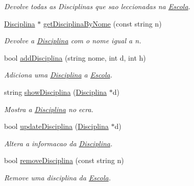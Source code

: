 \begin{DoxyCompactItemize}
\begin{DoxyCompactList}\small\item\em Devolve todas as Disciplinas que sao leccionadas na \hyperlink{class_escola}{Escola}. \end{DoxyCompactList}\item 
\hypertarget{class_escola_a75b1f1a614ca1163cf2c53f25331b939}{\hyperlink{class_disciplina}{Disciplina} $\ast$ \hyperlink{class_escola_a75b1f1a614ca1163cf2c53f25331b939}{get\-Disciplina\-By\-Nome} (const string n)}\label{class_escola_a75b1f1a614ca1163cf2c53f25331b939}

\begin{DoxyCompactList}\small\item\em Devolve a \hyperlink{class_disciplina}{Disciplina} com o nome igual a n. \end{DoxyCompactList}\item 
\hypertarget{class_escola_ad60836279a3f0a7d974a49b950aabda0}{bool \hyperlink{class_escola_ad60836279a3f0a7d974a49b950aabda0}{add\-Disciplina} (string nome, int d, int h)}\label{class_escola_ad60836279a3f0a7d974a49b950aabda0}

\begin{DoxyCompactList}\small\item\em Adiciona uma \hyperlink{class_disciplina}{Disciplina} a \hyperlink{class_escola}{Escola}. \end{DoxyCompactList}\item 
\hypertarget{class_escola_a3578c85887dd28c9d0b6f7c7f10f3020}{string \hyperlink{class_escola_a3578c85887dd28c9d0b6f7c7f10f3020}{show\-Disciplina} (\hyperlink{class_disciplina}{Disciplina} $\ast$d)}\label{class_escola_a3578c85887dd28c9d0b6f7c7f10f3020}

\begin{DoxyCompactList}\small\item\em Mostra a \hyperlink{class_disciplina}{Disciplina} no ecra. \end{DoxyCompactList}\item 
\hypertarget{class_escola_a3e5bd122514b59138e8fac07ca63e23a}{bool \hyperlink{class_escola_a3e5bd122514b59138e8fac07ca63e23a}{update\-Disciplina} (\hyperlink{class_disciplina}{Disciplina} $\ast$d)}\label{class_escola_a3e5bd122514b59138e8fac07ca63e23a}

\begin{DoxyCompactList}\small\item\em Altera a informacao da \hyperlink{class_disciplina}{Disciplina}. \end{DoxyCompactList}\item 
\hypertarget{class_escola_a2e726efed10bae8f782f2f5370ec9f44}{bool \hyperlink{class_escola_a2e726efed10bae8f782f2f5370ec9f44}{remove\-Disciplina} (const string n)}\label{class_escola_a2e726efed10bae8f782f2f5370ec9f44}

\begin{DoxyCompactList}\small\item\em Remove uma disciplina da \hyperlink{class_escola}{Escola}. \end{DoxyCompactList}\end{DoxyCompactItemize}



